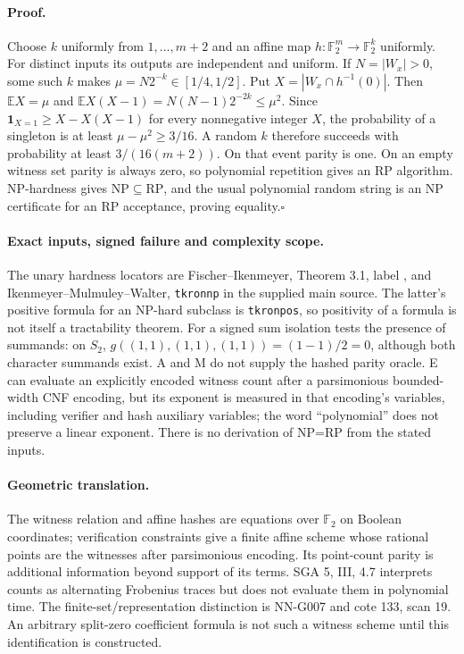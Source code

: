 \paragraph{Proof.}
Choose $k$ uniformly from $1,\ldots,m+2$ and an affine map
$h:\mathbb F_2^m\to\mathbb F_2^k$ uniformly. For distinct
inputs its outputs are independent and uniform. If
$N=|W_x|>0$, some such $k$ makes
$\mu=N2^{-k}\in[1/4,1/2]$. Put
$X=|W_x\cap h^{-1}(0)|$. Then
$\mathbb E X=\mu$ and
$\mathbb E X(X-1)=N(N-1)2^{-2k}\le\mu^2$.
Since $\mathbf1_{X=1}\ge X-X(X-1)$ for every nonnegative
integer $X$, the probability of a singleton is at least
$\mu-\mu^2\ge3/16$. A random $k$ therefore succeeds with
probability at least $3/(16(m+2))$. On that event parity is
one. On an empty witness set parity is always zero, so
polynomial repetition gives an RP algorithm. NP-hardness
gives $\mathrm{NP}\subseteq\mathrm{RP}$, and the usual
polynomial random string is an NP certificate for an RP
acceptance, proving equality.\hfill$\square$

\paragraph{Exact inputs, signed failure and complexity scope.}
The unary hardness locators are Fischer--Ikenmeyer,
Theorem 3.1, label ,
and Ikenmeyer--Mulmuley--Walter, \texttt{tkronnp} in the
supplied main source. The latter's positive formula for
an NP-hard subclass is \texttt{tkronpos}, so positivity of
a formula is not itself a tractability theorem.
For a signed sum isolation tests the presence of summands:
on $S_2$, $g((1,1),(1,1),(1,1))=(1-1)/2=0$, although
both character summands exist. A and M do not supply the
hashed parity oracle. E can evaluate an explicitly encoded
witness count after a parsimonious bounded-width CNF
encoding, but its exponent is measured in that encoding's
variables, including verifier and hash auxiliary variables;
the word ``polynomial'' does not preserve a linear exponent.
There is no derivation of NP=RP from the stated inputs.

\paragraph{Geometric translation.}
The witness relation and affine hashes are equations over
$\mathbb F_2$ on Boolean coordinates; verification constraints
give a finite affine scheme whose rational points are the
witnesses after parsimonious encoding. Its point-count
parity is additional information beyond support of its
terms. SGA 5, III, 4.7 interprets counts as alternating
Frobenius traces but does not evaluate them in polynomial
time. The finite-set/representation distinction is
NN-G007 and cote 133, scan 19. An arbitrary split-zero
coefficient formula is not such a witness scheme until
this identification is constructed.



